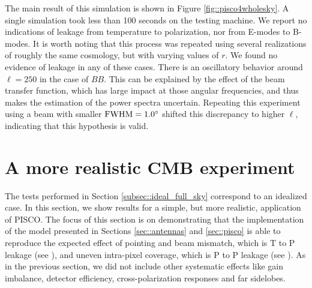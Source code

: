 \documentclass[a4paper,11pt]{article}
\begin{document}
The main result of this simulation is shown in Figure \ref{fig::pisco4wholesky}. A single simulation took less than 100 seconds on the testing machine. We report no indications of leakage from temperature to polarization, nor from E-modes to B-modes. It is worth noting that this process was repeated using several realizations of roughly the same cosmology, but with varying values of $r$. We found no evidence of leakage in any of these cases. There is an oscillatory behavior around $\ell=250$ in the case of $BB$. This can be explained by the effect of the beam transfer function, which has large impact at those angular frequencies, and thus makes the estimation of the power spectra uncertain. Repeating this experiment using a beam with smaller $\rm{FWHM} = 1.0^{\circ}$ shifted this discrepancy to higher $\ell$, indicating that this hypothesis is valid. 

\section{A more realistic CMB experiment}
\label{sec::realistic_cmb_experiment}


The tests performed in Section \ref{subsec::ideal_full_sky} correspond to an idealized case. In this section, we show results for a simple, but more realistic, application of PISCO. The focus of this section is on demonstrating that the implementation of the model presented in Sections \ref{sec::antennas} and \ref{sec::pisco} is able to reproduce the expected effect of pointing and beam mismatch, which is T to P leakage (see \cite{2007MNRAS.376.1767O}), and uneven intra-pixel coverage, which is P to P leakage (see \cite{2005poutanen}). As in the previous section, we did not include other systematic effects like gain imbalance, detector efficiency, cross-polarization responses and far sidelobes.
 
\end{document}
